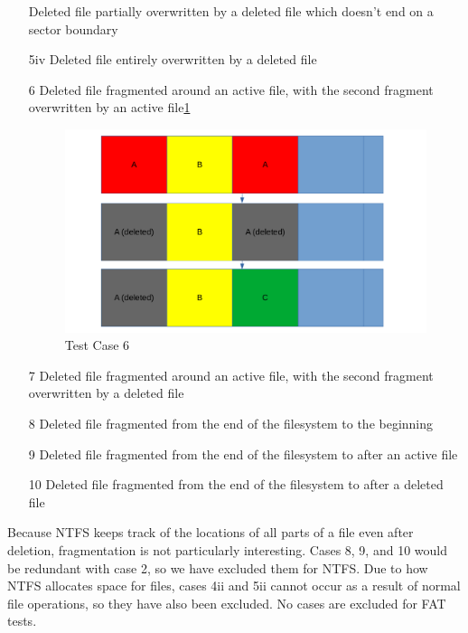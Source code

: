 \begin{itemize}
 Deleted file partially overwritten by a deleted file which doesn't end on a sector boundary
    \item [5iv]
 Deleted file entirely overwritten by a deleted file
    \item [6]
 Deleted file fragmented around an active file, with the second fragment overwritten by an active file\ref{fig:case_6}
    \begin{figure}[h]
        \centering
        \includegraphics[width=\linewidth]{fig/case6.png}
        \caption{Test Case 6}
        \label{fig:case_6}
    \end{figure}
    \item [7]
 Deleted file fragmented around an active file, with the second fragment overwritten by a deleted file
    \item [8]
 Deleted file fragmented from the end of the filesystem to the beginning
    \item [9]
 Deleted file fragmented from the end of the filesystem to after an active file
    \item [10]
 Deleted file fragmented from the end of the filesystem to after a deleted file
\end{itemize}

Because NTFS keeps track of the locations of all parts of a file even after deletion, fragmentation is not particularly interesting. Cases 8, 9, and 10 would be redundant with case 2, so we have excluded them for NTFS. Due to how NTFS allocates space for files, cases 4ii and 5ii cannot occur as a result of normal file operations, so they have also been excluded. No cases are excluded for FAT tests.



